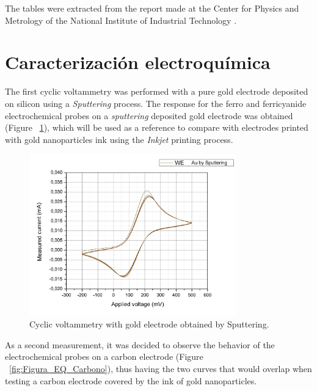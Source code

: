 The tables were extracted from the report made at the Center for Physics and Metrology of the National Institute of Industrial Technology \cite{caracdimen}.

\section{Caracterización electroquímica}
The first cyclic voltammetry was performed with a pure gold electrode deposited on silicon using a \textit{Sputtering} process. The response for the ferro and ferricyanide electrochemical probes on a \textit{sputtering} deposited gold electrode was obtained (Figure ~\ref{fig:Figura_EQ_Oro_Sputtering_1mm}), which will be used as a reference to compare with electrodes printed with gold nanoparticles ink using the \textit{Inkjet} printing process.

\begin{figure}[H]
  \centering
    \includegraphics[width=0.8\textwidth]{Figures/Figura_EQ_Oro_Sputtering_1mm}
  \caption{Cyclic voltammetry with gold electrode obtained by Sputtering.}
  \label{fig:Figura_EQ_Oro_Sputtering_1mm}
\end{figure}

As a second measurement, it was decided to observe the behavior of the electrochemical probes on a carbon electrode (Figure ~\ref{fig:Figura_EQ_Carbono}), thus having the two curves that would overlap when testing a carbon electrode covered by the ink of gold nanoparticles.

